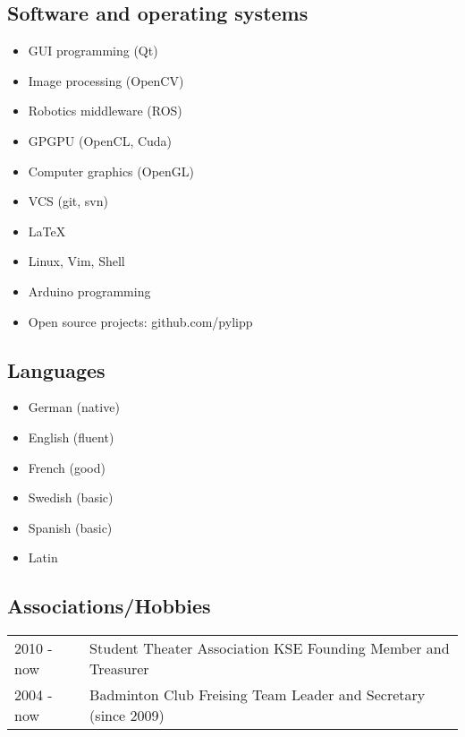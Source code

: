 \documentclass[a4paper,10pt]{memoir}
\begin{document}
\subsection*{Software and operating systems}
\vspace*{-\baselineskip}
\begin{multicols}{2}
\begin{itemize}
  \item GUI programming (Qt)
  \item Image processing (OpenCV)
  \item Robotics middleware (ROS)
  \item GPGPU (OpenCL, Cuda)
  \item Computer graphics (OpenGL)
  \item VCS (git, svn)
  \item \LaTeX
  \item Linux, Vim, Shell
  \item Arduino programming
  \item Open source projects: github.com/pylipp
\end{itemize}
\end{multicols}

\subsection*{Languages}
\vspace*{-\baselineskip}
\begin{multicols}{3}
  \begin{itemize}
    \item German (native)
    \item English (fluent)
    \item French (good)
    \item Swedish (basic)
    \item Spanish (basic)
    \item Latin
  \end{itemize}
\end{multicols}

\subsection*{Associations/Hobbies}
\vspace*{-\baselineskip}
\begin{longtable}{@{}p{} p{}}
  2010 - now &
  Student Theater Association KSE \newline 
  Founding Member and Treasurer
  \\
  2004 - now &
  Badminton Club Freising \newline 
  Team Leader and Secretary (since 2009)
\end{longtable}
\end{document}
